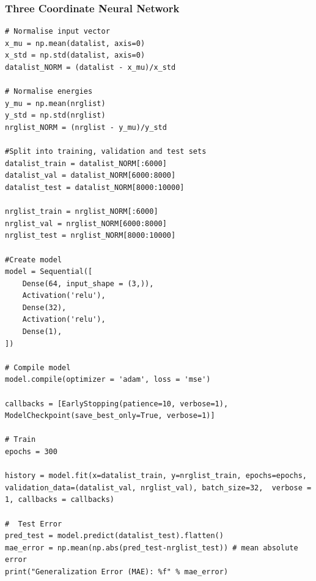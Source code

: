 \documentclass[12pt,a4paper]{article}
\begin{document}
\subsubsection{Three Coordinate Neural Network} \label{code:net1}
\begin{lstlisting}
# Normalise input vector
x_mu = np.mean(datalist, axis=0)
x_std = np.std(datalist, axis=0)
datalist_NORM = (datalist - x_mu)/x_std

# Normalise energies
y_mu = np.mean(nrglist)
y_std = np.std(nrglist)
nrglist_NORM = (nrglist - y_mu)/y_std

#Split into training, validation and test sets
datalist_train = datalist_NORM[:6000]
datalist_val = datalist_NORM[6000:8000]
datalist_test = datalist_NORM[8000:10000]

nrglist_train = nrglist_NORM[:6000]
nrglist_val = nrglist_NORM[6000:8000]
nrglist_test = nrglist_NORM[8000:10000]

#Create model
model = Sequential([
    Dense(64, input_shape = (3,)),
    Activation('relu'),
    Dense(32),
    Activation('relu'),
    Dense(1),
])

# Compile model
model.compile(optimizer = 'adam', loss = 'mse')

callbacks = [EarlyStopping(patience=10, verbose=1), ModelCheckpoint(save_best_only=True, verbose=1)]

# Train
epochs = 300

history = model.fit(x=datalist_train, y=nrglist_train, epochs=epochs, validation_data=(datalist_val, nrglist_val), batch_size=32,  verbose = 1, callbacks = callbacks)

#  Test Error
pred_test = model.predict(datalist_test).flatten()
mae_error = np.mean(np.abs(pred_test-nrglist_test)) # mean absolute error
print("Generalization Error (MAE): %f" % mae_error)
\end{lstlisting}
\end{document}
